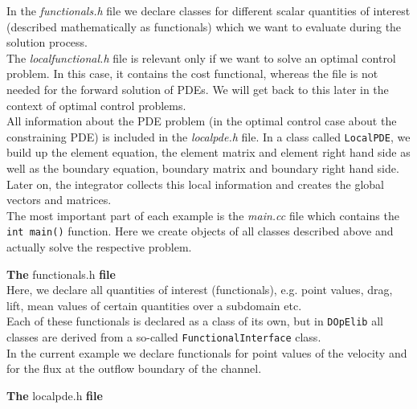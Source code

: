 In the \textit{functionals.h} file we declare classes for different scalar quantities of interest (described mathematically as functionals) which we want to evaluate during the solution process.\\

The \textit{localfunctional.h} file is relevant only if we want to solve an optimal control problem. In this case, it contains the cost functional, whereas the file is not needed for the forward solution of PDEs. We will get back to this later in the context of optimal control problems.\\

All information about the PDE problem (in the optimal control case about the constraining PDE) is included in the \textit{localpde.h} file. In a class called \texttt{LocalPDE}, we build up the element equation, the element matrix and element right hand side as well as the boundary equation, boundary matrix and boundary right hand side. Later on, the integrator collects this local information and creates the global vectors and matrices.\\

The most important part of each example is the \textit{main.cc} file which contains the \texttt{int main()} function. Here we create objects of all classes described above and actually solve the respective problem.\\
 
\vspace{0.2cm}

\textbf{The} functionals.h \textbf{file}\\

\vspace{0.2cm}
Here, we declare all quantities of interest (functionals), e.g. point values, drag, lift, mean values of certain quantities over a subdomain etc. \\
Each of these functionals is declared as a class of its own, but in \texttt{DOpElib} all classes are derived from a so-called \texttt{FunctionalInterface} class.\\
In the current example we declare functionals for point values of the velocity and for the flux at the outflow boundary of the channel. \\

\vspace{0.2cm}

\textbf{The} localpde.h \textbf{file}\\

